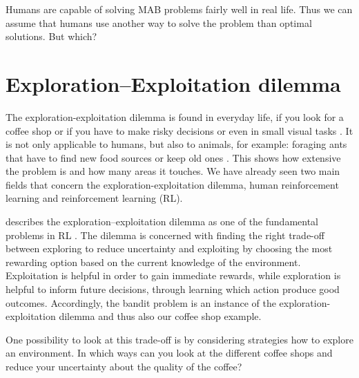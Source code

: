 Humans are capable of solving MAB problems fairly well in real life. Thus we can assume that humans use another way to solve the problem than optimal solutions. But which?   


\section{Exploration--Exploitation dilemma}
The exploration-exploitation dilemma is found in everyday life, if you look for a coffee shop or if you have to make risky decisions \citep{gonzalez2011instance, analytis2019make, schulz2018generalization} or even in small visual tasks \citep{chun1996just}. It is not only applicable to humans, but also to animals, for example: foraging ants that have to find new food sources or keep old ones \citep{cook2013exploration}. 
This shows how extensive the problem is and how many areas it touches. We have already seen two main fields that concern the exploration-exploitation dilemma, human reinforcement learning and reinforcement learning (RL).  

\cite{kaelbling1996reinforcement} describes the exploration--exploitation dilemma as one of the fundamental problems in RL \citep{kaelbling1996reinforcement}.
The dilemma is concerned with finding the right trade-off between exploring to reduce uncertainty and exploiting by choosing the most rewarding option based on the current knowledge of the environment. Exploitation is helpful in order to gain immediate rewards, while exploration is helpful to inform future decisions, through learning which action produce good outcomes. 
Accordingly, the bandit problem is an instance of the exploration-exploitation dilemma and thus also our coffee shop example. 

One possibility to look at this trade-off is by considering strategies how to explore an environment. In which ways can you look at the different coffee shops and reduce your uncertainty about the quality of the coffee? 


